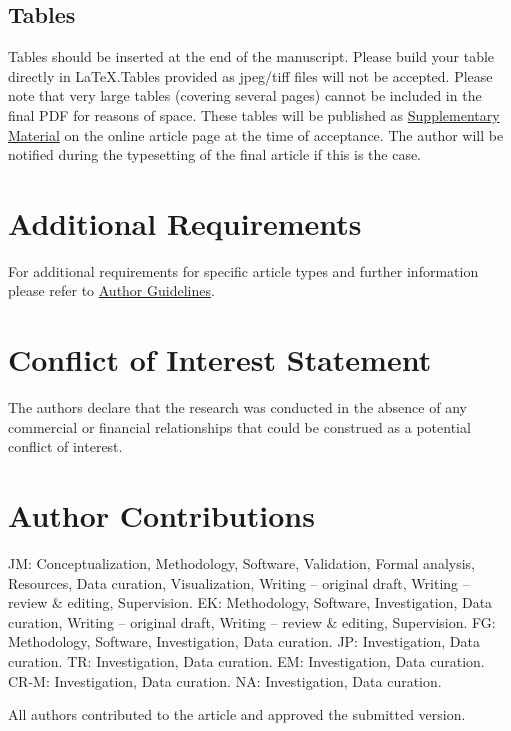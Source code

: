 \documentclass[utf8]{FrontiersinHarvard} %
\begin{document}
\subsection{Tables}
Tables should be inserted at the end of the manuscript. Please build your table directly in LaTeX.Tables provided as jpeg/tiff files will not be accepted. Please note that very large tables (covering several pages) cannot be included in the final PDF for reasons of space. These tables will be published as \href{http://home.frontiersin.org/about/author-guidelines#SupplementaryMaterial}{Supplementary Material} on the online article page at the time of acceptance. The author will be notified during the typesetting of the final article if this is the case. 


\section{Additional Requirements}

For additional requirements for specific article types and further information please refer to \href{http://www.frontiersin.org/about/AuthorGuidelines#AdditionalRequirements}{Author Guidelines}.

\section*{Conflict of Interest Statement}
The authors declare that the research was conducted in the absence of any commercial or financial relationships that could be construed as a potential conflict of interest.

\section*{Author Contributions}
JM: Conceptualization, Methodology, Software, Validation, Formal analysis, Resources, Data curation, Visualization, Writing – original draft, Writing – review \& editing, Supervision.
EK: Methodology, Software, Investigation, Data curation, Writing – original draft, Writing – review \& editing, Supervision.
FG: Methodology, Software, Investigation, Data curation.
JP: Investigation, Data curation.
TR: Investigation, Data curation.
EM: Investigation, Data curation.
CR-M: Investigation, Data curation.
NA: Investigation, Data curation.

All authors contributed to the article and approved the submitted version.
\end{document}
